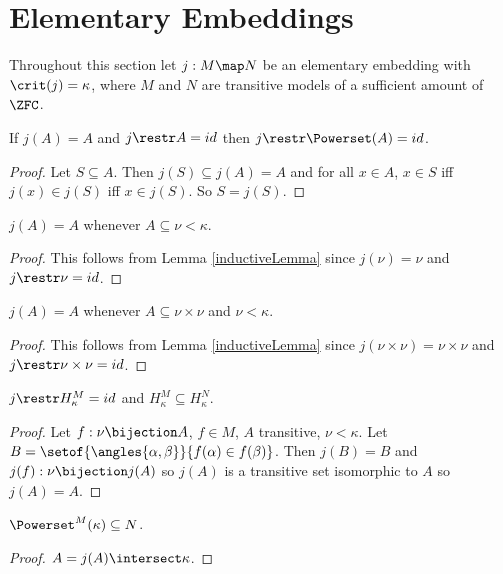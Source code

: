 \documentclass[oneside,12pt]{amsart}
\begin{document}
\section{Elementary Embeddings}

Throughout this section let $j:M \map N$ be an elementary embedding with $\crit(j)=\kappa$, where $M$ and $N$ are transitive models of a sufficient amount of $\ZFC$.

\begin{lemma}
\label{inductiveLemma}
If $j(A) = A$ and $j\restr A = id$ then $j\restr \Powerset(A) = id$.
\end{lemma}
\begin{proof}
Let $S\subseteq A$. Then $j(S) \subseteq j(A) = A$ and for all $x\in A$,
$x \in S$ iff $j(x) \in j(S)$ iff $x\in j(S)$. So $S = j(S)$.
\end{proof}


\begin{corollary}
\label{subsetLemma}
$j(A) = A$ whenever $A\subseteq \nu < \kappa$.
\end{corollary}
\begin{proof}
This follows from Lemma \ref{inductiveLemma} since $j(\nu) = \nu$ and
$j \restr \nu = id$.
\end{proof}

\begin{lemma}
\label{crossProductLemma}
$j(A) = A$ whenever $A\subseteq \nu \times \nu $ and $\nu < \kappa$.
\end{lemma}
\begin{proof}
This follows from Lemma \ref{inductiveLemma} since $j(\nu \times \nu) = \nu \times \nu$ and
$j \restr \nu \times \nu = id$.
\end{proof}

\begin{lemma}
$j\restr H^{M}_{\kappa} = id$ and $H^{M}_{\kappa}\subseteq H^{N}_{\kappa}$.
\end{lemma}
\begin{proof}
Let $f:\nu\bijection A$, $f\in M$, $A$ transitive, $\nu<\kappa$. Let
$B=\setof{\angles{\alpha, \beta}}{f(\alpha) \in f(\beta)}$. Then $j(B) = B$
and $j(f):\nu\bijection j(A)$ so $j(A)$ is a transitive set isomorphic to $A$
so $j(A)=A$.
\end{proof}

\begin{lemma}
\label{lemma0}
$\Powerset^{M}(\kappa) \subseteq N$.
\end{lemma}
\begin{proof}
$A=j(A)\intersect\kappa$.
\end{proof}
\end{document}
